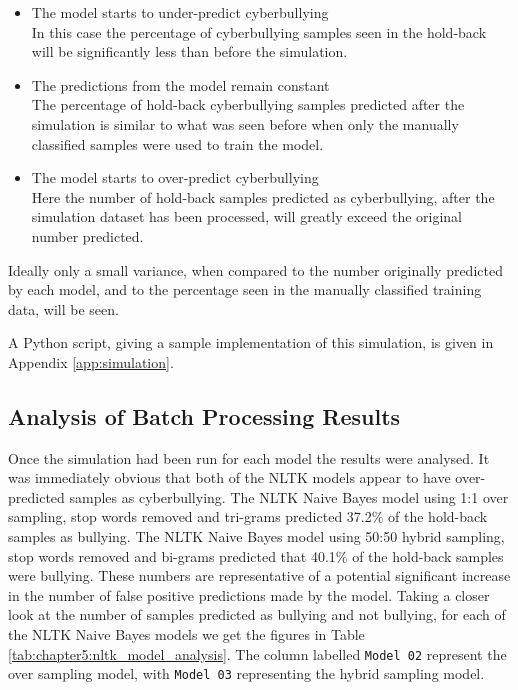 \begin{itemize}

	\item The model starts to under-predict cyberbullying \\
	In this case the percentage of cyberbullying samples seen in the hold-back will be significantly less than before the simulation. 
	\item The predictions from the model remain constant \\
	The percentage of hold-back cyberbullying samples predicted after the simulation is similar to what was seen before when only the manually classified samples were used to train the model.
	\item The model starts to over-predict cyberbullying \\
	Here the number of hold-back samples predicted as cyberbullying, after the simulation dataset has been processed, will greatly exceed the original number predicted.

\end{itemize}

Ideally only a small variance, when compared to the number originally predicted by each model, and to the percentage seen in the manually classified training data, will be seen.

A Python script, giving a sample implementation of this simulation, is given in Appendix \ref{app:simulation}.

\subsection{Analysis of Batch Processing Results}

Once the simulation had been run for each model the results were analysed. It was immediately obvious that both of the NLTK models appear to have over-predicted samples as cyberbullying. The NLTK Naive Bayes model using 1:1 over sampling, stop words removed and tri-grams predicted 37.2\% of the hold-back samples as bullying. The NLTK Naive Bayes model using 50:50 hybrid sampling, stop words removed and bi-grams predicted that 40.1\% of the hold-back samples were bullying. These numbers are representative of a potential significant increase in the number of false positive predictions made by the model. Taking a closer look at the number of samples predicted as bullying and not bullying, for each of the NLTK Naive Bayes models we get the figures in Table \ref{tab:chapter5:nltk_model_analysis}. The column labelled \verb|Model 02| represent the over sampling model, with \verb|Model 03| representing the hybrid sampling model.


